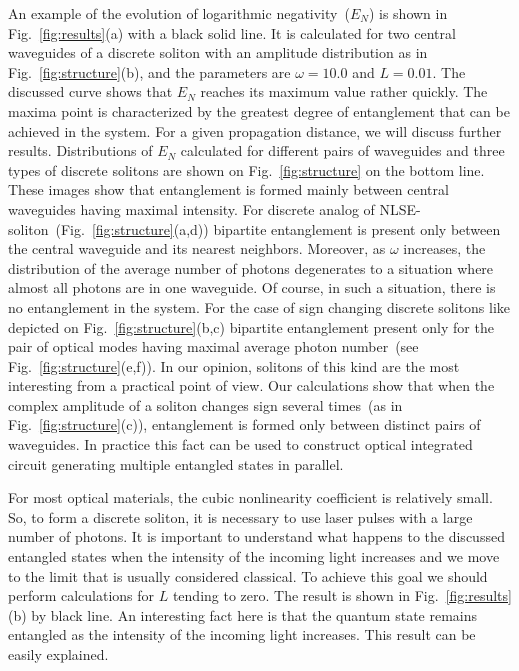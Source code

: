 \documentclass[9pt,twocolumn,twoside]{osajnl}
\begin{document}
An example of the evolution of logarithmic negativity~($E_N$) is shown in Fig.~\ref{fig:results}(a) with a black solid line.
It is calculated for two central waveguides of a discrete soliton with an amplitude distribution as in Fig.~\ref{fig:structure}(b), and the parameters are $\omega=10.0$ and $L=0.01$.
The discussed curve shows that $ E_N $ reaches its maximum value rather quickly. The maxima point is characterized by the greatest degree of entanglement that can be achieved in the system. 
For a given propagation distance, we will discuss further results.
Distributions of $E_N$ calculated for different pairs of waveguides and three types of discrete solitons are shown on Fig.~\ref{fig:structure} on the bottom line.
These images show that entanglement is formed mainly between central waveguides having maximal intensity.
For discrete analog of NLSE-soliton~(Fig.~\ref{fig:structure}(a,d)) bipartite entanglement is present only between the central waveguide and its nearest neighbors.
Moreover, as $\omega$ increases, the distribution of the average number of photons degenerates to a situation where almost all photons are in one waveguide. 
Of course, in such a situation, there is no entanglement in the system.
For the case of sign changing discrete solitons like depicted on Fig.~\ref{fig:structure}(b,c) bipartite entanglement present only for the pair of optical modes having maximal average photon number~(see Fig.~\ref{fig:structure}(e,f)). 
In our opinion, solitons of this kind are the most interesting from a practical point of view.
Our calculations show that when the complex amplitude of a soliton changes sign several times~(as in Fig.~\ref{fig:structure}(c)), entanglement is formed only between distinct pairs of waveguides.
In practice this fact can be used to construct optical integrated circuit generating multiple entangled states in parallel.
\par
For most optical materials, the cubic nonlinearity coefficient is relatively small. 
So, to form a discrete soliton, it is necessary to use laser pulses with a large number of photons.
It is important to understand what happens to the discussed entangled states when the intensity of the incoming light increases and we move to the limit that is usually considered classical.
To achieve this goal we should perform calculations for $L$ tending to zero.
The result is shown in Fig.~\ref{fig:results}(b) by black line. 
An interesting fact here is that the quantum state remains entangled as the intensity of the incoming light increases.
This result can be easily explained.
\end{document}
